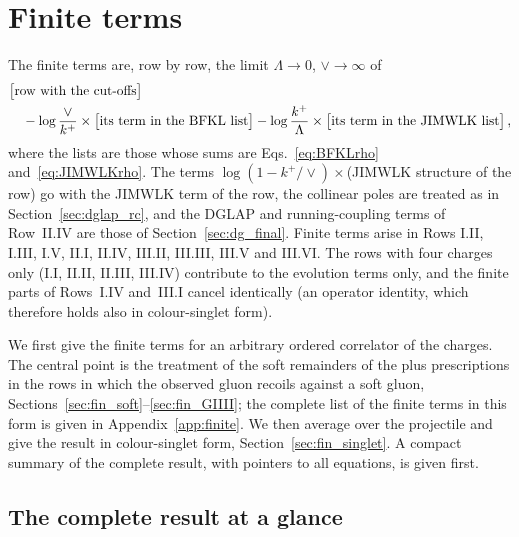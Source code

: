 \begingroup\sloppy
\section{Finite terms}\label{sec:finite}

The finite terms are, row by row, the limit $\Lambda\to0$, $\vee\to\infty$ of
\begin{align}\label{eq:fin_def}
&\big[\text{row with the cut-offs}\big]\notag\\&\quad-\log\frac{\vee}{k^+}\times\big[\text{its term in the BFKL list}\big]-\log\frac{k^+}{\Lambda}\times\big[\text{its term in the JIMWLK list}\big]\,,
\end{align}
where the lists are those whose sums are Eqs.~\eqref{eq:BFKLrho} and~\eqref{eq:JIMWLKrho}. The terms $\log(1-k^+/\vee)\times$(JIMWLK structure of the row) go with the JIMWLK term of the row, the collinear poles are treated as in Section~\ref{sec:dglap_rc}, and the DGLAP and running-coupling terms of Row~II.IV are those of Section~\ref{sec:dg_final}. Finite terms arise in Rows I.II, I.III, I.V, II.I, II.IV, III.II, III.III, III.V and III.VI. The rows with four charges only (I.I, II.II, II.III, III.IV) contribute to the evolution terms only, and the finite parts of Rows~I.IV and~III.I cancel identically (an operator identity, which therefore holds also in colour-singlet form).

We first give the finite terms for an arbitrary ordered correlator of the charges. The central point is the treatment of the soft remainders of the plus prescriptions in the rows in which the observed gluon recoils against a soft gluon, Sections~\ref{sec:fin_soft}--\ref{sec:fin_GIIII}; the complete list of the finite terms in this form is given in Appendix~\ref{app:finite}. We then average over the projectile and give the result in colour-singlet form, Section~\ref{sec:fin_singlet}. A compact summary of the complete result, with pointers to all equations, is given first.

\subsection{The complete result at a glance}\label{sec:result_summary}

